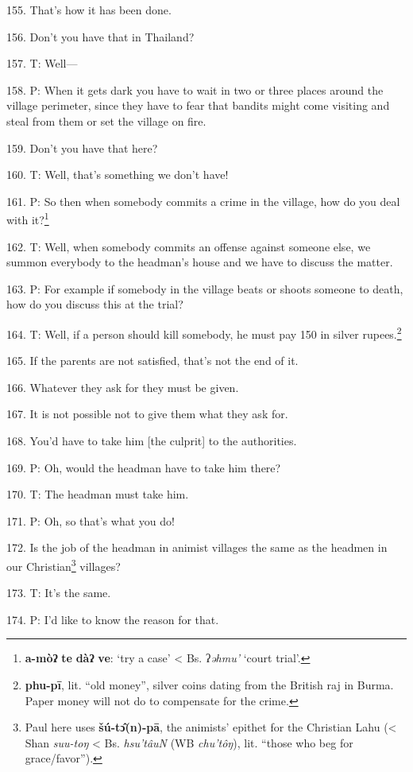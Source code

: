 155. That's how it has been done.

156. Don't you have that in Thailand?

157. T: Well---

158. P: When it gets dark you have to wait in two or three places around the village
perimeter, since they have to fear that bandits might come visiting and steal from
them or set the village on fire.

159. Don't you have that here?

160. T: Well, that's something we don't have!

161. P: So then when somebody commits a crime in the village, how do you deal with
it?\footnote{\textbf{a-mòʔ} \textbf{te} \textbf{dàʔ} \textbf{ve}: `try a case' < Bs. ʔ\textit{əhmu'} `court trial'.}

162. T: Well, when somebody commits an offense against someone else, we summon
everybody to the headman's house and we have to discuss the matter.

163. P: For example if somebody in the village beats or shoots someone to death,
how do you discuss this at the trial?

164. T: Well, if a person should kill somebody, he must pay 150 in silver rupees.\footnote{\textbf{phu-pī}, lit. ``old money'', silver coins dating from the British raj in Burma. Paper money will not do to compensate for the crime.}

165. If the parents are not satisfied, that's not the end of it.

166. Whatever they ask for they must be given.

167. It is not possible not to give them what they ask for.

168. You'd have to take him [the culprit] to the authorities.

169. P: Oh, would the headman have to take him there?

170. T: The headman must take him.

171. P: Oh, so that's what you do!

172. Is the job of the headman in animist villages the same as the headmen in our
Christian\footnote{Paul here uses \textbf{šú-tɔ̂(n)-pā}, the animists' epithet for the Christian Lahu (< Shan \textit{suu-toŋ} < Bs. \textit{hsu'tâuN} (WB \textit{chu'tôŋ}), lit. ``those who beg for grace/favor'').} villages?

173. T: It's the same.

174. P: I'd like to know the reason for that.

